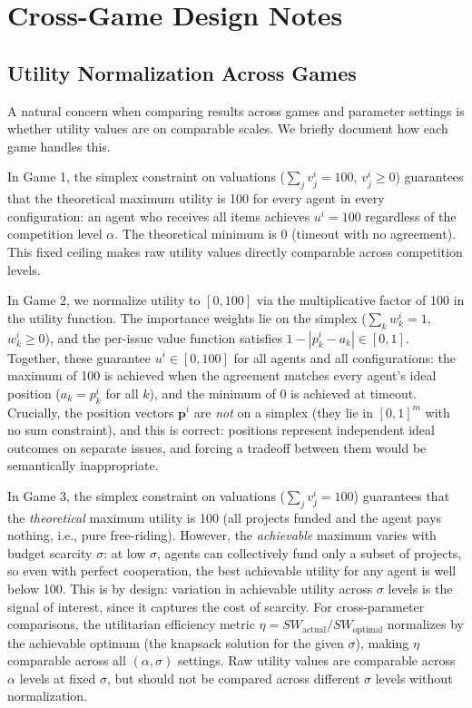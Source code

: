 \section{Cross-Game Design Notes}
\label{sec:cross_game_notes}

\subsection{Utility Normalization Across Games}
\label{sec:normalization}

A natural concern when comparing results across games and parameter settings is whether utility values are on comparable scales.
We briefly document how each game handles this.

In Game 1, the simplex constraint on valuations ($\sum_j v^i_j = 100$, $v^i_j \geq 0$) guarantees that the theoretical maximum utility is 100 for every agent in every configuration: an agent who receives all items achieves $u^i = 100$ regardless of the competition level $\alpha$.
The theoretical minimum is 0 (timeout with no agreement).
This fixed ceiling makes raw utility values directly comparable across competition levels.

In Game 2, we normalize utility to $[0, 100]$ via the multiplicative factor of 100 in the utility function.
The importance weights lie on the simplex ($\sum_k w^i_k = 1$, $w^i_k \geq 0$), and the per-issue value function satisfies $1 - |p^i_k - a_k| \in [0, 1]$.
Together, these guarantee $u^i \in [0, 100]$ for all agents and all configurations: the maximum of 100 is achieved when the agreement matches every agent's ideal position ($a_k = p^i_k$ for all $k$), and the minimum of 0 is achieved at timeout.
Crucially, the position vectors $\bm{p}^i$ are \emph{not} on a simplex (they lie in $[0,1]^m$ with no sum constraint), and this is correct: positions represent independent ideal outcomes on separate issues, and forcing a tradeoff between them would be semantically inappropriate.

In Game 3, the simplex constraint on valuations ($\sum_j v^i_j = 100$) guarantees that the \emph{theoretical} maximum utility is 100 (all projects funded and the agent pays nothing, i.e., pure free-riding).
However, the \emph{achievable} maximum varies with budget scarcity $\sigma$: at low $\sigma$, agents can collectively fund only a subset of projects, so even with perfect cooperation, the best achievable utility for any agent is well below 100.
This is by design: variation in achievable utility across $\sigma$ levels is the signal of interest, since it captures the cost of scarcity.
For cross-parameter comparisons, the utilitarian efficiency metric $\eta = SW_{\text{actual}} / SW_{\text{optimal}}$ normalizes by the achievable optimum (the knapsack solution for the given $\sigma$), making $\eta$ comparable across all $(\alpha, \sigma)$ settings.
Raw utility values are comparable across $\alpha$ levels at fixed $\sigma$, but should not be compared across different $\sigma$ levels without normalization.

